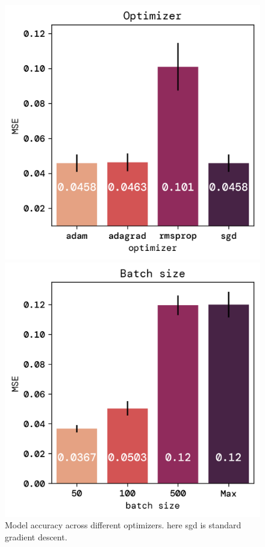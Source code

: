 \documentclass[twoside,11pt]{report}
\begin{document}
    \begin{figure}[!ht]
        \begin{minipage}[t]{0.5\textwidth - 1mm}
            \begin{center}
                \includegraphics[width=\textwidth]{../runsAndFigures/MSE_optimizer.png}
            \end{center}
            \caption
            {
                Model accuracy across different optimizers. here sgd is standard gradient descent.
            }\label{fig:MSE_optimizer}
        \end{minipage}
        \hspace{2mm}
        \begin{minipage}[t]{0.5\textwidth - 1mm}
            \begin{center}
                \includegraphics[width=\textwidth]{../runsAndFigures/MSE_batch.png}

\end{center}
\end{minipage}
\end{figure}
\end{document}
